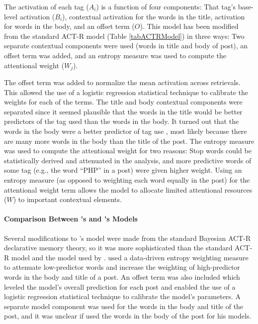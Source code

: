 \documentclass[man,floatsintext,donotrepeattitle]{apa6}
\begin{document}
The activation of each tag ($A_{i}$) is a function of four components:
That tag's base-level activation ($B_{i}$), contextual activation for the words in the title, activation for words in the body, and an offset term ($O$).
This model has been modified from the standard ACT-R model (Table \ref{tabACTRModel}) in three ways:
Two separate contextual components were used (words in title and body of post), an offset term was added, and an entropy measure was used to compute the attentional weight ($W_{j}$).

The offset term was added to normalize the mean activation across retrievals.
This allowed the use of a logistic regression statistical technique to calibrate the weights for each of the terms.
The title and body contextual components were separated since it seemed plausible that the words in the title would be better predictors of the tag used than the words in the body.
It turned out that the words in the body were a better predictor of tag use \parencite{Stanley2013}, most likely because there are many more words in the body than the title of the post.
The entropy measure was used to compute the attentional weight for two reasons:
Stop words could be statistically derived and attenuated in the analysis, and more predictive words of some tag (e.g., the word ``PHP'' in a post) were given higher weight.
Using an entropy measure (as opposed to weighting each word equally in the post) for the attentional weight term allows the model to allocate limited attentional resources ($W$) to important contextual elements.

\paragraph{Comparison Between \citeauthor{Kuo2011}'s and \citeauthor{Stanley2013}'s Models}

Several modifications to \textcite{Stanley2013}'s model were made from the standard Bayesian ACT-R declarative memory theory,
so it was more sophisticated than the standard ACT-R model and the model used by \textcite{Kuo2011}.
\citeauthor{Stanley2013} used a data-driven entropy weighting measure to attenuate low-predictor words and increase the weighting of high-predictor words in the body and title of a post.
An offset term was also included which leveled the model's overall prediction for each post and enabled the use of a logistic regression statistical technique to calibrate the model's parameters.
A separate model component was used for the words in the body and title of the post, and it was unclear if \citeauthor{Kuo2011} used the words in the body of the post for his models.
\end{document}
